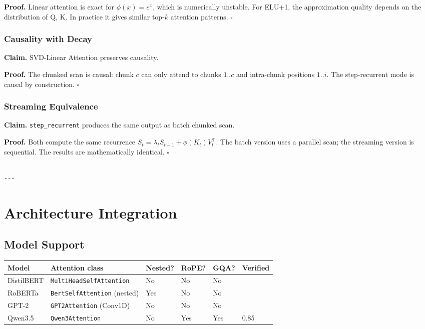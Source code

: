 \textbf{Proof.} Linear attention is exact for $\phi(x) = e^x$, which is 
numerically unstable. For ELU+1, the approximation quality depends on the 
distribution of Q, K. In practice it gives similar top-$k$ attention patterns. $\square$

\subsubsection{Causality with Decay}

\textbf{Claim.} SVD-Linear Attention preserves causality.

\textbf{Proof.} The chunked scan is causal: chunk $c$ can only attend to chunks 
$1..c$ and intra-chunk positions $1..i$. The step-recurrent mode is causal 
by construction. $\square$

\subsubsection{Streaming Equivalence}

\textbf{Claim.} \texttt{step\_recurrent} produces the same output as batch chunked scan.

\textbf{Proof.} Both compute the same recurrence $S_t = \lambda_t S_{t-1} + \phi(K_t) V_t^\top$. 
The batch version uses a parallel scan; the streaming version is sequential. 
The results are mathematically identical. $\square$
\begin{lstlisting}

---
\end{lstlisting}


\section{Architecture Integration}

\subsection{Model Support}

\begin{table}[H]
\centering
\small
\begin{tabular}{llllll}
\toprule
\textbf{Model} & \textbf{Attention class} & \textbf{Nested?} & \textbf{RoPE?} & \textbf{GQA?} & \textbf{Verified} \\
\midrule
DistilBERT & \texttt{MultiHeadSelfAttention} & No & No & No &  \\
RoBERTa & \texttt{BertSelfAttention} (nested) & Yes & No & No &  \\
GPT-2 & \texttt{GPT2Attention} (Conv1D) & No & No & No &  \\
Qwen3.5 & \texttt{Qwen3Attention} & No & Yes & Yes & 0.85 \\
\bottomrule
\end{tabular}
\end{table}

